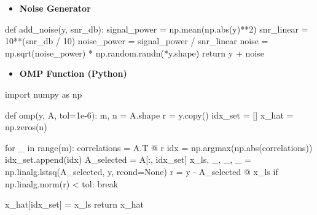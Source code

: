 \documentclass[
  letterpaper,
  DIV=11,
  numbers=noendperiod]{scrartcl}
\newenvironment{Shaded}{\begin{snugshade}}{\end{snugshade}}
\newcommand{\BuiltInTok}[1]{\textcolor[rgb]{0.40,0.85,0.94}{#1}}
\newcommand{\ControlFlowTok}[1]{\textcolor[rgb]{0.98,0.15,0.45}{#1}}
\newcommand{\DecValTok}[1]{\textcolor[rgb]{0.68,0.51,1.00}{#1}}
\newcommand{\FloatTok}[1]{\textcolor[rgb]{0.68,0.51,1.00}{#1}}
\newcommand{\ImportTok}[1]{\textcolor[rgb]{0.98,0.15,0.45}{#1}}
\newcommand{\KeywordTok}[1]{\textcolor[rgb]{0.98,0.15,0.45}{#1}}
\newcommand{\NormalTok}[1]{\textcolor[rgb]{0.97,0.97,0.95}{#1}}
\newcommand{\OperatorTok}[1]{\textcolor[rgb]{0.97,0.97,0.95}{#1}}
\newcommand{\VariableTok}[1]{\textcolor[rgb]{0.97,0.97,0.95}{#1}}
\providecommand{\tightlist}{%
  \setlength{\itemsep}{0pt}\setlength{\parskip}{0pt}}
\begin{document}
\begin{itemize}
\tightlist
\item
  \textbf{Noise Generator}
\end{itemize}

\begin{Shaded}
\begin{Highlighting}[]
\KeywordTok{def}\NormalTok{ add\_noise(y, snr\_db):}
\NormalTok{    signal\_power }\OperatorTok{=}\NormalTok{ np.mean(np.}\BuiltInTok{abs}\NormalTok{(y)}\OperatorTok{**}\DecValTok{2}\NormalTok{)}
\NormalTok{    snr\_linear }\OperatorTok{=} \DecValTok{10}\OperatorTok{**}\NormalTok{(snr\_db }\OperatorTok{/} \DecValTok{10}\NormalTok{)}
\NormalTok{    noise\_power }\OperatorTok{=}\NormalTok{ signal\_power }\OperatorTok{/}\NormalTok{ snr\_linear}
\NormalTok{    noise }\OperatorTok{=}\NormalTok{ np.sqrt(noise\_power) }\OperatorTok{*}\NormalTok{ np.random.randn(}\OperatorTok{*}\NormalTok{y.shape)}
    \ControlFlowTok{return}\NormalTok{ y }\OperatorTok{+}\NormalTok{ noise}
\end{Highlighting}
\end{Shaded}

\begin{itemize}
\tightlist
\item
  \textbf{OMP Function (Python)}
\end{itemize}

\begin{Shaded}
\begin{Highlighting}[]
\ImportTok{import}\NormalTok{ numpy }\ImportTok{as}\NormalTok{ np}

\KeywordTok{def}\NormalTok{ omp(y, A, tol}\OperatorTok{=}\FloatTok{1e{-}6}\NormalTok{):}
\NormalTok{    m, n }\OperatorTok{=}\NormalTok{ A.shape}
\NormalTok{    r }\OperatorTok{=}\NormalTok{ y.copy()}
\NormalTok{    idx\_set }\OperatorTok{=}\NormalTok{ []}
\NormalTok{    x\_hat }\OperatorTok{=}\NormalTok{ np.zeros(n)}

    \ControlFlowTok{for}\NormalTok{ \_ }\KeywordTok{in} \BuiltInTok{range}\NormalTok{(m):}
\NormalTok{        correlations }\OperatorTok{=}\NormalTok{ A.T }\OperatorTok{@}\NormalTok{ r}
\NormalTok{        idx }\OperatorTok{=}\NormalTok{ np.argmax(np.}\BuiltInTok{abs}\NormalTok{(correlations))}
\NormalTok{        idx\_set.append(idx)}
\NormalTok{        A\_selected }\OperatorTok{=}\NormalTok{ A[:, idx\_set]}
\NormalTok{        x\_ls, \_, \_, \_ }\OperatorTok{=}\NormalTok{ np.linalg.lstsq(A\_selected, y, rcond}\OperatorTok{=}\VariableTok{None}\NormalTok{)}
\NormalTok{        r }\OperatorTok{=}\NormalTok{ y }\OperatorTok{{-}}\NormalTok{ A\_selected }\OperatorTok{@}\NormalTok{ x\_ls}
        \ControlFlowTok{if}\NormalTok{ np.linalg.norm(r) }\OperatorTok{\textless{}}\NormalTok{ tol:}
            \ControlFlowTok{break}

\NormalTok{    x\_hat[idx\_set] }\OperatorTok{=}\NormalTok{ x\_ls}
    \ControlFlowTok{return}\NormalTok{ x\_hat}
\end{Highlighting}
\end{Shaded}
\end{document}
